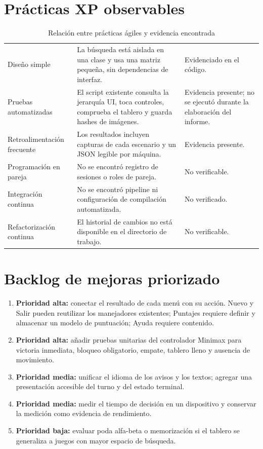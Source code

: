 \section{Prácticas XP observables}
\begin{table}[H]
\centering
\small
\caption{Relación entre prácticas ágiles y evidencia encontrada}\label{tab:xp}
\begin{tabular}{P{3.1cm}P{6.2cm}P{4.5cm}}
\toprule
{} &  & \\
\midrule
Diseño simple & La búsqueda está aislada en una clase y usa una matriz pequeña, sin dependencias de interfaz. & Evidenciado en el código.\\
Pruebas automatizadas & El script existente consulta la jerarquía UI, toca controles, comprueba el tablero y guarda hashes de imágenes. & Evidencia presente; no se ejecutó durante la elaboración del informe.\\
Retroalimentación frecuente & Los resultados incluyen capturas de cada escenario y un JSON legible por máquina. & Evidencia presente.\\
Programación en pareja & No se encontró registro de sesiones o roles de pareja. & No verificable.\\
Integración continua & No se encontró pipeline ni configuración de compilación automatizada. & No verificado.\\
Refactorización continua & El historial de cambios no está disponible en el directorio de trabajo. & No verificable.\\
\bottomrule
\end{tabular}
\end{table}

\section{Backlog de mejoras priorizado}
\begin{enumerate}
  \item \textbf{Prioridad alta:} conectar el resultado de cada menú con su acción. Nuevo y Salir pueden reutilizar los manejadores existentes; Puntajes requiere definir y almacenar un modelo de puntuación; Ayuda requiere contenido.
  \item \textbf{Prioridad alta:} añadir pruebas unitarias del controlador Minimax para victoria inmediata, bloqueo obligatorio, empate, tablero lleno y ausencia de movimiento.
  \item \textbf{Prioridad media:} unificar el idioma de los avisos y los textos; agregar una presentación accesible del turno y del estado terminal.
  \item \textbf{Prioridad media:} medir el tiempo de decisión en un dispositivo y conservar la medición como evidencia de rendimiento.
  \item \textbf{Prioridad baja:} evaluar poda alfa-beta o memorización si el tablero se generaliza a juegos con mayor espacio de búsqueda.
\end{enumerate}

